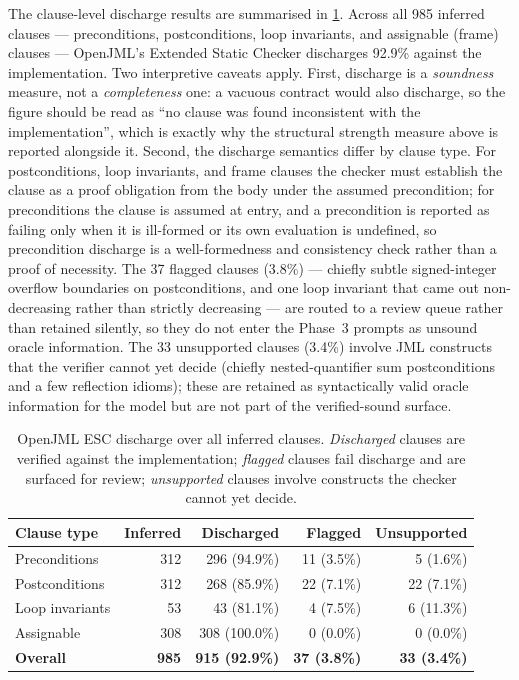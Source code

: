 The clause-level discharge results are summarised in
\cref{tab:art1:discharge}. Across all 985 inferred clauses --- preconditions,
postconditions, loop invariants, and assignable (frame) clauses --- OpenJML's
Extended Static Checker discharges 92.9\% against the implementation. Two
interpretive caveats apply. First, discharge is a \emph{soundness} measure, not a
\emph{completeness} one: a vacuous contract would also discharge, so the figure
should be read as \enquote{no clause was found inconsistent with the
implementation}, which is exactly why the structural strength measure above is
reported alongside it. Second, the discharge semantics differ by clause type. For
postconditions, loop invariants, and frame clauses the checker must establish the
clause as a proof obligation from the body under the assumed precondition; for
preconditions the clause is assumed at entry, and a precondition is reported as
failing only when it is ill-formed or its own evaluation is undefined, so
precondition discharge is a well-formedness and consistency check rather than a
proof of necessity. The 37 flagged clauses (3.8\%) --- chiefly subtle
signed-integer overflow boundaries on postconditions, and one loop invariant that
came out non-decreasing rather than strictly decreasing --- are routed to a review
queue rather than retained silently, so they do not enter the Phase~3 prompts as
unsound oracle information. The 33 unsupported clauses (3.4\%) involve JML
constructs that the verifier cannot yet decide (chiefly nested-quantifier sum
postconditions and a few reflection idioms); these are retained as syntactically
valid oracle information for the model but are not part of the verified-sound
surface.

\begin{table}[ht]
\centering
\caption{OpenJML ESC discharge over all inferred clauses. \emph{Discharged}
clauses are verified against the implementation; \emph{flagged} clauses fail
discharge and are surfaced for review; \emph{unsupported} clauses involve
constructs the checker cannot yet decide.}
\label{tab:art1:discharge}
\begin{tabular}{lrrrr}
\toprule
\textbf{Clause type} & \textbf{Inferred} & \textbf{Discharged} & \textbf{Flagged} & \textbf{Unsupported} \\
\midrule
Preconditions   & 312 & 296 (94.9\%)  & 11 (3.5\%) &  5 (1.6\%)  \\
Postconditions  & 312 & 268 (85.9\%)  & 22 (7.1\%) & 22 (7.1\%)  \\
Loop invariants &  53 &  43 (81.1\%)  &  4 (7.5\%) &  6 (11.3\%) \\
Assignable      & 308 & 308 (100.0\%) &  0 (0.0\%) &  0 (0.0\%)  \\
\midrule
\textbf{Overall} & \textbf{985} & \textbf{915 (92.9\%)} & \textbf{37 (3.8\%)} & \textbf{33 (3.4\%)} \\
\bottomrule
\end{tabular}
\end{table}

